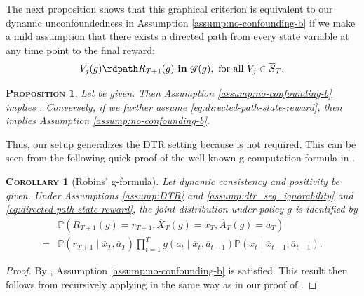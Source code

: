 \documentclass[12pt,a4paper]{article}
\newtheorem{corollary}[theorem]{\normalfont\scshape Corollary}
\newtheorem{proposition}[theorem]{\normalfont\scshape  Proposition}
\theoremstyle{definition}
\newcommand{\PP}[0]{\mathbb{P}}
\newcommand{\ingraph}[1]{~\textnormal{\bf in}\,#1}
\newcommand{\textnot}{\textnormal{\bf not}~}
\DeclareMathOperator{\gG}{\mathscr{G}}
\begin{document}
The next proposition shows that this graphical criterion is equivalent
to our dynamic unconfoundedness in Assumption \ref{assump:no-confounding-b}
if we make a mild assumption that there exists a directed path from
every state variable at any time point to the final reward:
\begin{equation}
  \label{eq:directed-path-state-reward}
        V_j(g) \rdpath R_{T+1}(g) \ingraph{\gG(g)}, ~ \text{for
          all}~V_j \in \overline{S}_T.
\end{equation}

\begin{proposition}\label{prop:seq_ignorability_and_dyn_unconfoundedness}
    Let  be given. Then
    Assumption \ref{assump:no-confounding-b} implies
    . Conversely, if we further
    assume \eqref{eq:directed-path-state-reward}, then
     implies
    Assumption \ref{assump:no-confounding-b}.
\end{proposition}

Thus, our setup generalizes the DTR setting because 
is not required. This can be seen from the following quick proof
of the well-known g-computation formula in
\textcite{robins_new_1986,robins_causal_1997}.
\begin{corollary}[Robins' g-formula] \label{cor:g-formula}
  Let dynamic consistency and positivity be given. Under
  Assumptions \ref{assump:DTR} and \ref{assump:dtr_seq_ignorability} and
  \eqref{eq:directed-path-state-reward}, the joint distribution under
  policy $g$ is identified by
  \begin{align*}
    &\mathbb{P}(R_{T+1}(g) = r_{T+1}, \overline{X}_{T}(g) =
      \overline{x}_{T}, \overline{A}_{T}(g) = \overline{a}_{T}) \\
    =& \mathbb{P}(r_{T+1} \mid \overline{x}_T, \overline{a}_T) \prod_{t=1}^T g(a_{t} \mid \overline{x}_{t}, \overline{a}_{t-1}) \PP(x_{t} \mid \overline{x}_{t-1}, \overline{a}_{t-1}).
  \end{align*}
\end{corollary}
\begin{proof}
  By , Assumption
  \ref{assump:no-confounding-b} is satisfied. This result then follows
  from recursively applying  in the
  same way as in our proof of .
\end{proof}
\end{document}
